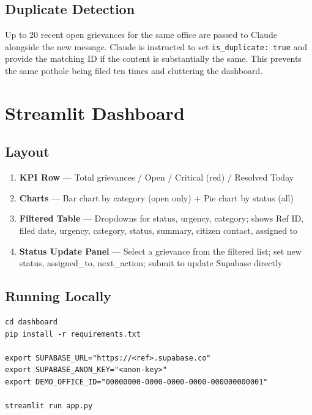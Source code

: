 \documentclass[11pt, a4paper]{article}
\begin{document}
\subsection{Duplicate Detection}

Up to 20 recent open grievances for the same office are passed to Claude alongside the new message. Claude is instructed to set \texttt{is\_duplicate: true} and provide the matching ID if the content is substantially the same. This prevents the same pothole being filed ten times and cluttering the dashboard.

\newpage

\section{Streamlit Dashboard}

\subsection{Layout}

\begin{enumerate}[leftmargin=1.5em]
  \item \textbf{KPI Row} — Total grievances / Open / Critical (red) / Resolved Today
  \item \textbf{Charts} — Bar chart by category (open only) + Pie chart by status (all)
  \item \textbf{Filtered Table} — Dropdowns for status, urgency, category; shows Ref ID, filed date, urgency, category, status, summary, citizen contact, assigned to
  \item \textbf{Status Update Panel} — Select a grievance from the filtered list; set new status, assigned\_to, next\_action; submit to update Supabase directly
\end{enumerate}

\subsection{Running Locally}

\begin{lstlisting}[style=bash]
cd dashboard
pip install -r requirements.txt

export SUPABASE_URL="https://<ref>.supabase.co"
export SUPABASE_ANON_KEY="<anon-key>"
export DEMO_OFFICE_ID="00000000-0000-0000-0000-000000000001"

streamlit run app.py
\end{lstlisting}
\end{document}
